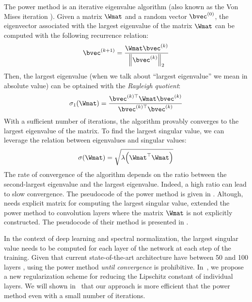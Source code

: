 
The power method is an iterative eigenvalue algorithm (also known as the Von Mises iteration \cite{mises1929praktische}).
Given a matrix $\Wmat$ and a random vector $\bvec^{(0)}$, the eigenvector associated with the largest eigenvalue of the matrix $\Wmat$ can be computed with the following recurrence relation:
\begin{equation}
  \bvec^{(k+1)} = \frac{\Wmat \bvec^{(k)}}{\norm{\bvec^{(k)}}_2}  
\end{equation}
Then, the largest eigenvalue (when we talk about ``largest eigenvalue'' we mean in absolute value) can be optained with the \emph{Rayleigh quotient}:
\begin{equation}
  \sigma_1\left( \Wmat \right) = \frac{\bvec^{(k)\top} \Wmat \bvec^{(k)}}{\bvec^{(k)\top} \bvec^{(k)}}
\end{equation}
With a sufficient number of iterations, the algorithm provably converges to the largest eigenvalue of the matrix.
To find the largest singular value, we can leverage the relation between eigenvalues and singular values:
\begin{equation}
  \sigma \left( \Wmat \right) = \sqrt{ \lambda \left( \Wmat^\top \Wmat \right) }
\end{equation}
The rate of convergence of the algorithm depends on the ratio between the second-largest eigenvalue and the largest eigenvalue.
Indeed, a high ratio can lead to slow convergence.
The pseudocode of the power method is given in .
Altough,  needs explicit matrix for computing the largest singular value, \citet{farnia2018generalizable,ryu2019plug} extended the power method to convolution layers where the matrix $\Wmat$ is not explicitly constructed.
The pseudocode of their method is presented in . 

In the context of deep learning and spectral normalization, the largest singular value needs to be computed for each layer of the network at each step of the training. 
Given that current state-of-the-art architecture have between 50 and 100 layers \cite{he2016deep,tan2019efficientnet}, using the power method \emph{until convergence} is prohibitive.
In~, we propose a new regularization scheme for reducing the Lipschitz constant of individual layers.
We will shown in~ that our approach is more efficient that the power method even with a small number of iterations.



